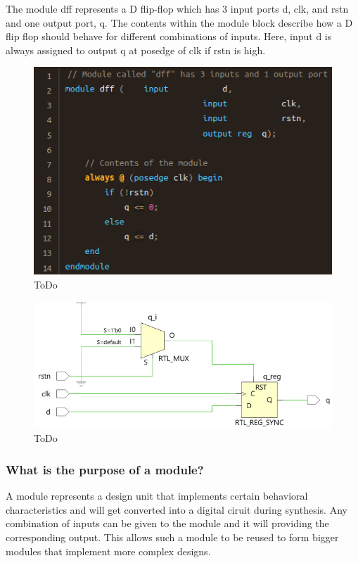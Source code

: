 \documentclass{article}
\begin{document}
	The module dff represents a D flip-flop which has 3 input ports d, clk, and rstn and one output port, q. The contents within the module block describe how a D flip flop should behave for different
	combinations of inputs. Here, input d is always assigned to output q at posedge of clk if rstn is high.

	\begin{figure}[H]
		\includegraphics[width=\linewidth]{VerilogPics/figure_27.png}
		\caption{ToDo}
		\label{ToDo}
	\end{figure}

	\begin{figure}[H]
		\includegraphics[width=\linewidth]{VerilogPics/figure_28.png}
		\caption{ToDo}
		\label{ToDo}
	\end{figure}

	\subsubsection{What is the purpose of a module?}

	A module represents a design unit that implements certain behavioral characteristics and will get converted into a digital ciruit during synthesis. Any combination of inputs can be given to the
	module and it will providing the corresponding output. This allows such a module to be reused to form bigger modules that implement more complex designs.
\end{document}
